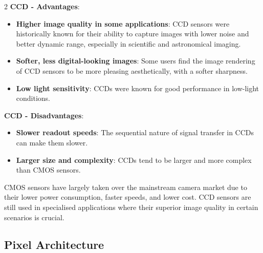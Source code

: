 \documentclass[10pt]{article}
\begin{document}
\begin{multicols}{2}
\textbf{CCD - Advantages}:
\begin{itemize}
    \item \textbf{Higher image quality in some applications}: CCD sensors were historically known for their ability to capture images with lower noise and better dynamic range, especially in scientific and astronomical imaging.
    \item \textbf{Softer, less digital-looking images}: Some users find the image rendering of CCD sensors to be more pleasing aesthetically, with a softer sharpness.
    \item \textbf{Low light sensitivity}: CCDs were known for good performance in low-light conditions.
\end{itemize}
\textbf{CCD - Disadvantages}:
\begin{itemize}
    \item \textbf{Slower readout speeds}: The sequential nature of signal transfer in CCDs can make them slower.
    \item \textbf{Larger size and complexity}: CCDs tend to be larger and more complex than CMOS sensors.
\end{itemize}
CMOS sensors have largely taken over the mainstream camera market due to their lower power consumption, faster speeds, and lower cost. CCD sensors are still used in specialised applications where their superior image quality in certain scenarios is crucial. 

\subsection{Pixel Architecture}

\end{multicols}
\end{document}
